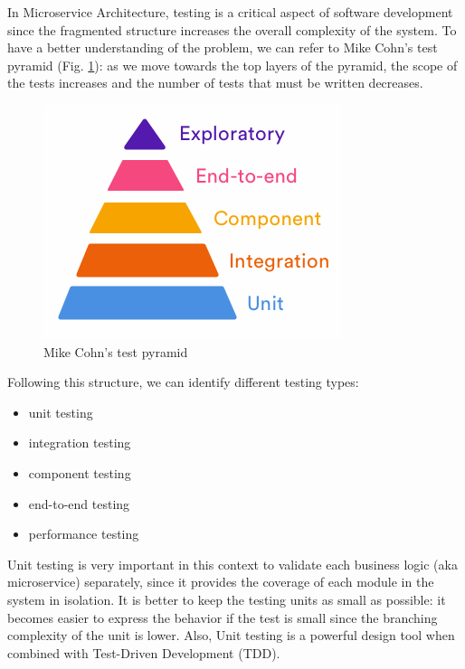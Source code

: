 
In Microservice Architecture, testing is a critical aspect of software development since the fragmented structure increases the overall complexity of the system.
To have a better understanding of the problem, we can refer to Mike Cohn’s test pyramid (Fig. \ref{fig:test_pyramid}): as we move towards the top layers of the pyramid, the scope of the tests increases and the number of tests that must be written decreases.

\begin{figure}[H]
	\centering
    \includegraphics[scale=0.4]{Images/Impl, Integr & Test/test_pyramid.png}
	\caption{\label{fig:test_pyramid}Mike Cohn's test pyramid}
\end{figure}

Following this structure, we can identify different testing types:
\begin{itemize}
    \item unit testing
    \item integration testing
    \item component testing
    \item end-to-end testing
    \item performance testing
\end{itemize}

Unit testing is very important in this context to validate each business logic (aka microservice) separately, since it provides the coverage of each module in the system in isolation. It is better to keep the testing units as small as possible: it becomes easier to express the behavior if the test is small since the branching complexity of the unit is lower. Also, Unit testing is a powerful design tool when combined with Test-Driven Development (TDD).
\newline

